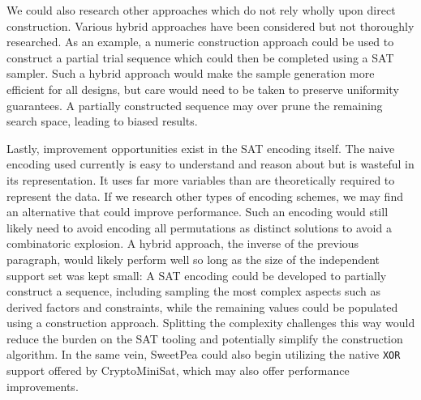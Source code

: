 We could also research other approaches which do not rely wholly upon direct construction. Various hybrid approaches have been considered but not thoroughly researched. As an example, a numeric construction approach could be used to construct a partial trial sequence which could then be completed using a SAT sampler. Such a hybrid approach would make the sample generation more efficient for all designs, but care would need to be taken to preserve uniformity guarantees. A partially constructed sequence may over prune the remaining search space, leading to biased results.

Lastly, improvement opportunities exist in the SAT encoding itself. The naive encoding used currently is easy to understand and reason about but is wasteful in its representation. It uses far more variables than are theoretically required to represent the data. If we research other types of encoding schemes, we may find an alternative that could improve performance. Such an encoding would still likely need to avoid encoding all permutations as distinct solutions to avoid a combinatoric explosion. A hybrid approach, the inverse of the previous paragraph, would likely perform well so long as the size of the independent support set was kept small: A SAT encoding could be developed to partially construct a sequence, including sampling the most complex aspects such as derived factors and constraints, while the remaining values could be populated using a construction approach. Splitting the complexity challenges this way would reduce the burden on the SAT tooling and potentially simplify the construction algorithm. In the same vein, SweetPea could also begin utilizing the native \texttt{XOR} support offered by CryptoMiniSat, which may also offer performance improvements.
